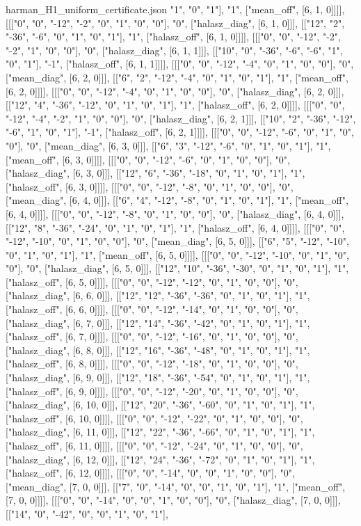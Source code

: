 \begin{filecontents*}[overwrite]{harman_H1_uniform_certificate.json}
"1", "0", "1"], "1", ["mean_off", [6, 1, 0]]]], [[["0", "0", "-12", "-2", "0", "1", "0", "0"], "0", ["halasz_diag", [6, 1, 0]]], [["12", "2", "-36", "-6", "0", "1", "0", "1"], "1", ["halasz_off", [6, 1, 0]]]], [[["0", "0", "-12", "-2", "-2", "1", "0", "0"], "0", ["halasz_diag", [6, 1, 1]]], [["10", "0", "-36", "-6", "-6", "1", "0", "1"], "-1", ["halasz_off", [6, 1, 1]]]], [[["0", "0", "-12", "-4", "0", "1", "0", "0"], "0", ["mean_diag", [6, 2, 0]]], [["6", "2", "-12", "-4", "0", "1", "0", "1"], "1", ["mean_off", [6, 2, 0]]]], [[["0", "0", "-12", "-4", "0", "1", "0", "0"], "0", ["halasz_diag", [6, 2, 0]]], [["12", "4", "-36", "-12", "0", "1", "0", "1"], "1", ["halasz_off", [6, 2, 0]]]], [[["0", "0", "-12", "-4", "-2", "1", "0", "0"], "0", ["halasz_diag", [6, 2, 1]]], [["10", "2", "-36", "-12", "-6", "1", "0", "1"], "-1", ["halasz_off", [6, 2, 1]]]], [[["0", "0", "-12", "-6", "0", "1", "0", "0"], "0", ["mean_diag", [6, 3, 0]]], [["6", "3", "-12", "-6", "0", "1", "0", "1"], "1", ["mean_off", [6, 3, 0]]]], [[["0", "0", "-12", "-6", "0", "1", "0", "0"], "0", ["halasz_diag", [6, 3, 0]]], [["12", "6", "-36", "-18", "0", "1", "0", "1"], "1", ["halasz_off", [6, 3, 0]]]], [[["0", "0", "-12", "-8", "0", "1", "0", "0"], "0", ["mean_diag", [6, 4, 0]]], [["6", "4", "-12", "-8", "0", "1", "0", "1"], "1", ["mean_off", [6, 4, 0]]]], [[["0", "0", "-12", "-8", "0", "1", "0", "0"], "0", ["halasz_diag", [6, 4, 0]]], [["12", "8", "-36", "-24", "0", "1", "0", "1"], "1", ["halasz_off", [6, 4, 0]]]], [[["0", "0", "-12", "-10", "0", "1", "0", "0"], "0", ["mean_diag", [6, 5, 0]]], [["6", "5", "-12", "-10", "0", "1", "0", "1"], "1", ["mean_off", [6, 5, 0]]]], [[["0", "0", "-12", "-10", "0", "1", "0", "0"], "0", ["halasz_diag", [6, 5, 0]]], [["12", "10", "-36", "-30", "0", "1", "0", "1"], "1", ["halasz_off", [6, 5, 0]]]], [[["0", "0", "-12", "-12", "0", "1", "0", "0"], "0", ["halasz_diag", [6, 6, 0]]], [["12", "12", "-36", "-36", "0", "1", "0", "1"], "1", ["halasz_off", [6, 6, 0]]]], [[["0", "0", "-12", "-14", "0", "1", "0", "0"], "0", ["halasz_diag", [6, 7, 0]]], [["12", "14", "-36", "-42", "0", "1", "0", "1"], "1", ["halasz_off", [6, 7, 0]]]], [[["0", "0", "-12", "-16", "0", "1", "0", "0"], "0", ["halasz_diag", [6, 8, 0]]], [["12", "16", "-36", "-48", "0", "1", "0", "1"], "1", ["halasz_off", [6, 8, 0]]]], [[["0", "0", "-12", "-18", "0", "1", "0", "0"], "0", ["halasz_diag", [6, 9, 0]]], [["12", "18", "-36", "-54", "0", "1", "0", "1"], "1", ["halasz_off", [6, 9, 0]]]], [[["0", "0", "-12", "-20", "0", "1", "0", "0"], "0", ["halasz_diag", [6, 10, 0]]], [["12", "20", "-36", "-60", "0", "1", "0", "1"], "1", ["halasz_off", [6, 10, 0]]]], [[["0", "0", "-12", "-22", "0", "1", "0", "0"], "0", ["halasz_diag", [6, 11, 0]]], [["12", "22", "-36", "-66", "0", "1", "0", "1"], "1", ["halasz_off", [6, 11, 0]]]], [[["0", "0", "-12", "-24", "0", "1", "0", "0"], "0", ["halasz_diag", [6, 12, 0]]], [["12", "24", "-36", "-72", "0", "1", "0", "1"], "1", ["halasz_off", [6, 12, 0]]]], [[["0", "0", "-14", "0", "0", "1", "0", "0"], "0", ["mean_diag", [7, 0, 0]]], [["7", "0", "-14", "0", "0", "1", "0", "1"], "1", ["mean_off", [7, 0, 0]]]], [[["0", "0", "-14", "0", "0", "1", "0", "0"], "0", ["halasz_diag", [7, 0, 0]]], [["14", "0", "-42", "0", "0", "1", "0", "1"], 
\end{filecontents*}
